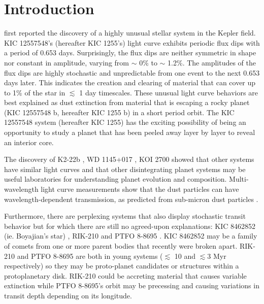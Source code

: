 \documentclass[preprint]{aastex61}
\newcommand{\sha}{KIC 1255 b}
\newcommand{\shStar}{KIC 1255}
\begin{document}


\section{Introduction}
\citet{rappaport} first reported the discovery of a highly unusual stellar system in the Kepler field.
KIC 12557548's (hereafter \shStar's) light curve exhibits periodic flux dips with a period of 0.653 days.
Surprisingly, the flux dips are neither symmetric in shape nor constant in amplitude, varying from $\sim$ 0\% to $\sim$ 1.2\%.
The amplitudes of the flux dips are highly stochastic and unpredictable from one event to the next 0.653 days later.
This indicates the creation and clearing of material that can cover up to 1\% of the star in $\lesssim$ 1 day timescales.
These unusual light curve behaviors are best explained as dust extinction from material that is escaping a rocky planet (KIC 12557548 b, hereafter \sha) in a short period orbit.
The KIC 12557548 system (hereafter \shStar) has the exciting possibility of being an opportunity to study a planet that has been peeled away layer by layer to reveal an interior core.

The discovery of K2-22b \citep{sanchis-ojedak2-22}, WD 1145+017 \citep{vanderburg2015wdDisintegrating}, KOI 2700 \citep{rappaport2014KOI2700} showed that other systems have similar light curves and that other disintegrating planet systems may be useful laboratories for understanding planet evolution and composition.
Multi-wavelength light curve measurements show that the dust particles can have wavelength-dependent transmission, as predicted from sub-micron dust particles \citep{bochinski2015evolving,sanchis-ojedak2-22}.

Furthermore, there are perplexing systems that also display stochastic transit behavior but for which there are still no agreed-upon explanations: KIC 8462852 (ie. Boyajian's star) \citep{boyajian846}, RIK-210 \citep{david2017rik210} and PTFO 8-8695 \citep{vanEyken2012ptfTTauri}.
KIC 8462852 may be a family of comets from one or more parent bodies that recently were broken apart.
RIK-210 and PTFO 8-8695 are both in young systems ($\lesssim$ 10 and $\lesssim$3 Myr respectively) so they may be proto-planet candidates or structures within a protoplanetary disk.
RIK-210 could be accreting material that causes variable extinction while PTFO 8-8695's orbit may be precessing and causing variations in transit depth depending on its longitude.
\end{document}
